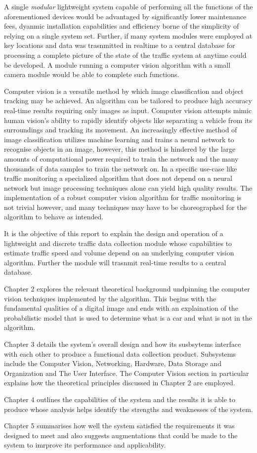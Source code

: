 A single \emph{modular} lightweight system capable of performing all the functions of the aforementioned devices would be advantaged by significantly lower maintenance fees, dyanmic installation capabilities and efficiency borne of the simplicity of relying on a single system set. Further, if many system modules were employed at key locations and data was trasnmitted in realtime to a central database for processing a complete picture of the state of the traffic system at anytime could be developed. A module running a computer vision algorithm with a small camera module would be able to complete such functions. 

Computer vision is a versatile method by which image classification and object tracking may be achieved. An algorithm can be tailored to produce high accuracy real-time results requiring only images as input. Computer vision attempts mimic human vision's ability to rapidly identify objects like separating a vehicle from its surroundings and tracking its movement. An increasingly effective method of image classification utilizes machine learning and trains a neural network to recognise objects in an image, however, this method is hindered by the large amounts of computational power required to train the network and the many thousands of data samples to train the network on. In a specific use-case like traffic monitoring a specialized algorithm that does not depend on a neural network but image processing techniques alone can yield high quality results. The implementation of a robust computer vision algorithm for traffic monitoring is not trivial however, and many techniques may have to be choreographed for the algorithm to behave as intended.

It is the objective of this report to explain the design and operation of a lightweight and discrete traffic data collection module whose capabilities to estimate traffic speed and volume depend on an underlying computer vision algorithm. Further the module will trasnmit real-time results to a central database.

Chapter 2 explores the relevant theoretical background undpinning the computer vision techniques implemented by the algorithm. This begins with the fundamental qualities of a digital image and ends with an explaination of the probabilistic model that is used to determine what is a car and what is not in the algorithm. 

Chapter 3 details the system's overall design and how its susbsytems interface with each other to produce a functional data collection product. Subsystems include the Computer Vision, Networking, Hardware, Data Storage and Organization and The User Interface. The Computer Vision section in particular explains how the theoretical principles discussed in Chapter 2 are employed.

Chapter 4 outlines the capabilities of the system and the results it is able to produce whose analysis helps identify the strengths and weaknesses of the system.

Chapter 5 summarises how well the system satisfied the requirements it was designed to meet and also suggests augmentations that could be made to the system to imrprove its performance and applicability.



